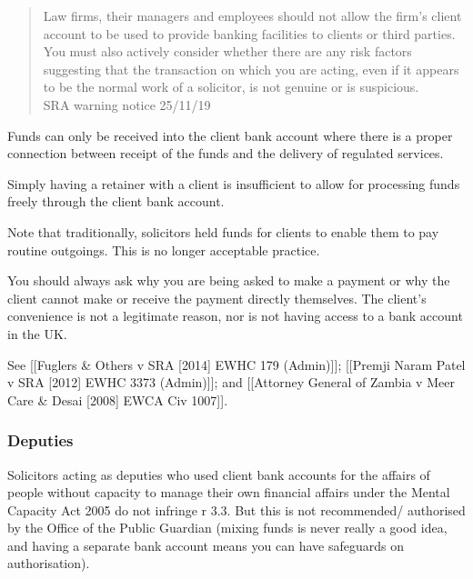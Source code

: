\documentclass[
]{article}
\newenvironment{Shaded}{}{}
\newcommand{\NormalTok}[1]{#1}
\begin{document}
\begin{quote}
Law firms, their managers and employees should not allow the firm's
client account to be used to provide banking facilities to clients or
third parties. You must also actively consider whether there are any
risk factors suggesting that the transaction on which you are acting,
even if it appears to be the normal work of a solicitor, is not genuine
or is suspicious.\\
SRA warning notice 25/11/19
\end{quote}

Funds can only be received into the client bank account where there is a
proper connection between receipt of the funds and the delivery of
regulated services.

Simply having a retainer with a client is insufficient to allow for
processing funds freely through the client bank account.

Note that traditionally, solicitors held funds for clients to enable
them to pay routine outgoings. This is no longer acceptable practice.

\begin{Shaded}
\begin{Highlighting}[]
\NormalTok{You should always ask why you are being asked to make a payment or why the client cannot make or receive the payment directly themselves. The client’s convenience is not a legitimate reason, nor is not having access to a bank account in the UK.}
\end{Highlighting}
\end{Shaded}

See {[}{[}Fuglers \& Others v SRA {[}2014{]} EWHC 179 (Admin){]}{]};
{[}{[}Premji Naram Patel v SRA {[}2012{]} EWHC 3373 (Admin){]}{]}; and
{[}{[}Attorney General of Zambia v Meer Care \& Desai {[}2008{]} EWCA
Civ 1007{]}{]}.

\hypertarget{deputies}{%
\subsubsection{Deputies}\label{deputies}}

Solicitors acting as deputies who used client bank accounts for the
affairs of people without capacity to manage their own financial affairs
under the Mental Capacity Act 2005 do not infringe r 3.3. But this is
not recommended/ authorised by the Office of the Public Guardian (mixing
funds is never really a good idea, and having a separate bank account
means you can have safeguards on authorisation).
\end{document}
